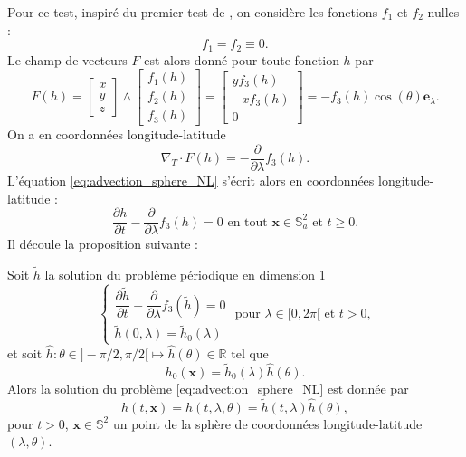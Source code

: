 Pour ce test, inspiré du premier test de \cite{BenArtzi2009}, on considère les fonctions $f_1$ et $f_2$ nulles :
\begin{equation}
f_1 = f_2 \equiv 0.
\end{equation}
Le champ de vecteurs $F$ est alors donné pour toute fonction $h$ par
\begin{equation}
F(h) = \begin{bmatrix}
x \\ y \\z
\end{bmatrix}
\wedge
\begin{bmatrix}
f_1(h) \\ f_2(h) \\ f_3(h)
\end{bmatrix} = \begin{bmatrix}
y f_3 (h) \\ -x f_3(h) \\ 0
\end{bmatrix} = -f_3(h) \cos (\theta) \mathbf{e}_{\lambda}.
\end{equation}
On a en coordonnées longitude-latitude
\begin{equation}
\nabla_T \cdot F(h) = - \dfrac{\partial}{\partial \lambda} f_3(h).
\end{equation}
L'équation \eqref{eq:advection_sphere_NL} s'écrit alors en coordonnées longitude-latitude :
\begin{equation}
\dfrac{\partial h}{\partial t} - \dfrac{\partial}{\partial \lambda}f_3(h) = 0 \text{ en tout } \mathbf{x} \in \mathbb{S}^2_a \text{ et } t \geq 0.
\end{equation}
Il découle la proposition suivante :

\begin{proposition}
Soit $\tilde{h}$ la solution du problème périodique en dimension 1
\begin{equation}
\left\lbrace
\begin{array}{rcl}
\dfrac{\partial \tilde{h}}{\partial t} - \dfrac{\partial}{\partial \lambda}f_3(\tilde{h}) = 0 \\
\tilde{h}(0,\lambda) = \tilde{h}_0(\lambda) 
\end{array}
\right. \text{ pour } \lambda \in [0, 2 \pi[ \text{ et } t > 0,
\label{eq:conservation_sph_burgers}
\end{equation}
et soit $\hat{h} : \theta \in ]- \pi/2, \pi/2[ \mapsto \hat{h}(\theta) \in \mathbb{R}$ tel que
\begin{equation}
h_0(\mathbf{x}) = \tilde{h}_0(\lambda) \hat{h}(\theta).
\end{equation}
Alors la solution du problème \eqref{eq:advection_sphere_NL} est donnée par
\begin{equation}
h(t,\mathbf{x}) = h(t,\lambda, \theta) = \tilde{h}(t,\lambda) \hat{h}(\theta),
\end{equation}
pour $t>0$, $\mathbf{x} \in \mathbb{S}^2$ un point de la sphère de coordonnées longitude-latitude $(\lambda, \theta)$.
\end{proposition}

